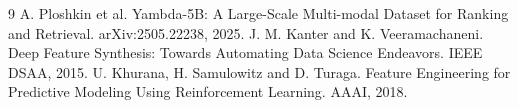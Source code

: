 \documentclass[10pt,a4paper]{article}
\begin{document}
\begin{thebibliography}{9}
 A. Ploshkin et al. Yambda-5B: A Large-Scale Multi-modal
Dataset for Ranking and Retrieval. arXiv:2505.22238, 2025.
 J. M. Kanter and K. Veeramachaneni. Deep Feature Synthesis:
Towards Automating Data Science Endeavors. IEEE DSAA, 2015.
 U. Khurana, H. Samulowitz and D. Turaga. Feature Engineering
for Predictive Modeling Using Reinforcement Learning. AAAI, 2018.
\end{thebibliography}
\end{document}
